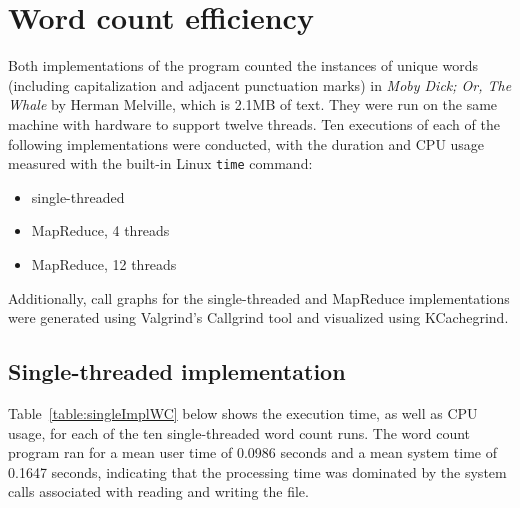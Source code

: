 \documentclass[12pt, letterpaper]{article}
\begin{document}
\section{Word count efficiency}
	Both implementations of the program counted the instances of unique words (including capitalization and adjacent punctuation marks) in \textit{Moby Dick; Or, The Whale} by Herman Melville, which is 2.1MB of text. They were run on the same machine with hardware to support twelve threads. Ten executions of each of the following implementations were conducted, with the duration and CPU usage measured with the built-in Linux \texttt{time} command:
	\begin{itemize}
	\item{single-threaded}
	\item{MapReduce, 4 threads}
	\item{MapReduce, 12 threads}
	\end{itemize}
	Additionally, call graphs for the single-threaded and MapReduce implementations were generated using Valgrind's Callgrind tool and visualized using KCachegrind.
\subsection{Single-threaded implementation}
	Table~\ref{table:singleImplWC} below shows the execution time, as well as CPU usage, for each of the ten single-threaded word count runs. The word count program ran for a mean user time of 0.0986 seconds and a mean system time of 0.1647 seconds, indicating that the processing time was dominated by the system calls associated with reading and writing the file.
	
\end{document}
